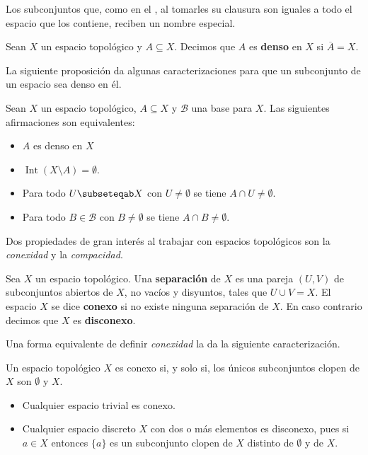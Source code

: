 Los subconjuntos que, como en el , al tomarles su clausura son iguales a todo el espacio que los contiene, reciben un nombre especial.
\begin{Def}
   Sean $X$ un espacio topológico y $A\subseteq X$. Decimos que $A$ es \textbf{denso} en $X$ si $\overline{A}=X$. 
\end{Def}
La siguiente proposición da algunas caracterizaciones para que un subconjunto de un espacio sea denso en él.
\begin{Prop}
   Sean $X$ un espacio topológico, $A\subseteq X$ y $\mathcal{B}$ una base para $X$. Las siguientes afirmaciones son equivalentes:
   \begin{itemize}
      \item[1.] $A$ es denso en $X$
      \item[2.] $\operatorname{Int}(X\setminus A)=\emptyset$. 
      \item[3.] Para todo $U\subseteqab X$ con $U\ne\emptyset$ se tiene $A\cap U\ne\emptyset$.
      \item[4.] Para todo $B\in \mathcal{B}$ con $B\ne \emptyset$ se tiene $A\cap B\ne \emptyset$.
   \end{itemize}
\end{Prop}
Dos propiedades de gran interés al trabajar con espacios topológicos son la \textit{conexidad} y la \textit{compacidad}.
\begin{Def}
   Sea $X$ un espacio topológico. Una \textbf{separación} de $X$ es una pareja $(U,V)$ de subconjuntos abiertos de $X$, no vacíos y disyuntos, tales que $U\cup V=X$. El espacio $X$ se dice \textbf{conexo} si no existe ninguna separación de $X$. En caso contrario decimos que $X$ es \textbf{disconexo}.
\end{Def}
Una forma equivalente de definir \textit{conexidad} la da la siguiente caracterización.
\begin{Prop}
   Un espacio topológico $X$ es conexo si, y solo si, los únicos subconjuntos clopen de $X$ son $\emptyset$ y $X$. 
\end{Prop}
\begin{Ejm}
   \phantom{o}
   \begin{itemize}
      \item Cualquier espacio trivial es conexo.
      \item Cualquier espacio discreto $X$ con dos o más elementos es disconexo, pues si $a\in X$ entonces $\{a\}$ es un subconjunto clopen de $X$ distinto de $\emptyset$ y de $X$.
   \end{itemize}
\end{Ejm}
